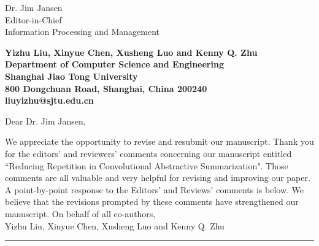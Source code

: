 \documentclass[11pt]{letter} %
\begin{document}
	
	
	\begin{letter}{Dr. Jim Jansen \\
			Editor-in-Chief  \\
			Information Processing and Management} 
		
        \begin{center}
        \large\bf Yizhu Liu, Xinyue Chen, Xusheng Luo and Kenny Q. Zhu \\ %
        Department of Computer Science and Engineering \\ Shanghai Jiao Tong University \\ 800 Dongchuan Road, Shanghai, China 200240 \\
        liuyizhu@sjtu.edu.cn
        \end{center} 
        \vfill

        \signature{Yizhu Liu} %
		
		
		\opening{Dear Dr. Jim Jansen,} 
		
		We appreciate the opportunity to revise and resubmit our manuscript. 
		Thank you for the editors' and reviewers' comments concerning our 
		manuscript entitled ``Reducing Repetition in Convolutional Abstractive Summarization". 
		Those comments are all valuable and very helpful
		for revising and improving our paper.
		A point-by-point response to the Editors' and Reviews' comments is below. 
		We believe that the revisions prompted by these comments have strengthened our manuscript.
		\newline\newline
		On behalf of all co-authors,\\
		Yizhu Liu, Xinyue Chen, Xusheng Luo and Kenny Q. Zhu
		\newline\hrule


\end{letter}
\end{document}
